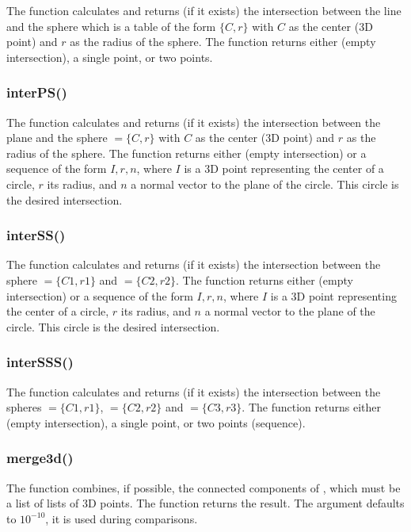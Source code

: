 The function  calculates and returns (if it exists) the intersection between the line  and the sphere  which is a table of the form $\{C,r\}$ with $C$ as the center (3D point) and $r$ as the radius of the sphere. The function returns either \nil (empty intersection), a single point, or two points.

\subsubsection{interPS()}

The function  calculates and returns (if it exists) the intersection between the plane  and the sphere $=\{C,r\}$ with $C$ as the center (3D point) and $r$ as the radius of the sphere. The function returns either \nil (empty intersection) or a sequence of the form $I,r,n$, where $I$ is a 3D point representing the center of a circle, $r$ its radius, and $n$ a normal vector to the plane of the circle. This circle is the desired intersection.

\subsubsection{interSS()}

The function  calculates and returns (if it exists) the intersection between the sphere $=\{C1,r1\}$ and $=\{C2,r2\}$. The function returns either \nil (empty intersection) or a sequence of the form $I,r,n$, where $I$ is a 3D point representing the center of a circle, $r$ its radius, and $n$ a normal vector to the plane of the circle. This circle is the desired intersection.

\subsubsection{interSSS()}

The function  calculates and returns (if it exists) the intersection between the spheres $=\{C1,r1\}$, $=\{C2,r2\}$ and $=\{C3,r3\}$. The function returns either \nil (empty intersection), a single point, or two points (sequence).

\subsubsection{merge3d()}

The function  combines, if possible, the connected components of , which must be a list of lists of 3D points. The function returns the result. The argument  defaults to $10^{-10}$, it is used during comparisons.

